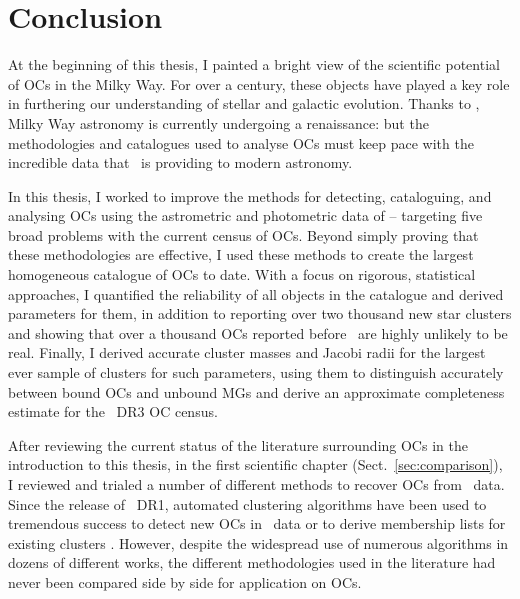 %
\chapter{Conclusion}
\label{sec:conclusion}


At the beginning of this thesis, I painted a bright view of the scientific potential of OCs in the Milky Way. For over a century, these objects have played a key role in furthering our understanding of stellar and galactic evolution. Thanks to \gaia, Milky Way astronomy is currently undergoing a renaissance: but the methodologies and catalogues used to analyse OCs must keep pace with the incredible data that \gaia\ is providing to modern astronomy.

In this thesis, I worked to improve the methods for detecting, cataloguing, and analysing OCs using the astrometric and photometric data of \gaia -- targeting five broad problems with the current census of OCs. Beyond simply proving that these methodologies are effective, I used these methods to create the largest homogeneous catalogue of OCs to date. With a focus on rigorous, statistical approaches, I quantified the reliability of all objects in the catalogue and derived parameters for them, in addition to reporting over two thousand new star clusters and showing that over a thousand OCs reported before \gaia\ are highly unlikely to be real. Finally, I derived accurate cluster masses and Jacobi radii for the largest ever sample of clusters for such parameters, using them to distinguish accurately between bound OCs and unbound MGs and derive an approximate completeness estimate for the \gaia\ DR3 OC census.

After reviewing the current status of the literature surrounding OCs in the introduction to this thesis, in the first scientific chapter (Sect.~\ref{sec:comparison}), I reviewed and trialed a number of different methods to recover OCs from \gaia\ data. Since the release of \gaia\ DR1, automated clustering algorithms have been used to tremendous success to detect new OCs in \gaia\ data or to derive membership lists for existing clusters \citep{castro-ginard_new_2018,castro-ginard_hunting_2019,castro-ginard_hunting_2020,castro-ginard_hunting_2022,liu_catalog_2019,cantat-gaudin_characterising_2018,cantat-gaudin_clusters_2020,cantat-gaudin_gaia_2019,he_catalogue_2021,he_new_2022,hao_sixteen_2020,jaehnig_membership_2021}. However, despite the widespread use of numerous algorithms in dozens of different works, the different methodologies used in the literature had never been compared side by side for application on OCs.


